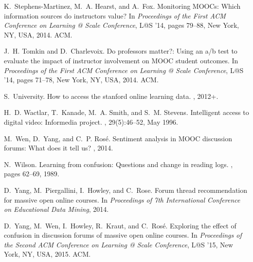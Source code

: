 \documentclass{edm_template}
\begin{document}
\begin{thebibliography}{10}
K.~Stephens-Martinez, M.~A. Hearst, and A.~Fox.
\newblock Monitoring {MOOC}s: Which information sources do instructors value?
\newblock In {\em Proceedings of the First ACM Conference on Learning @ Scale
  Conference}, L@S '14, pages 79--88, New York, NY, USA, 2014. ACM.

J.~H. Tomkin and D.~Charlevoix.
\newblock Do professors matter?: Using an a/b test to evaluate the impact of
  instructor involvement on {MOOC} student outcomes.
\newblock In {\em Proceedings of the First ACM Conference on Learning @ Scale
  Conference}, L@S '14, pages 71--78, New York, NY, USA, 2014. ACM.

S.~University.
\newblock How to access the stanford online learning data.
, 2012+.

H.~D. Wactlar, T.~Kanade, M.~A. Smith, and S.~M. Stevens.
\newblock Intelligent access to digital video: Informedia project.
, 29(5):46--52, May 1996.

M.~Wen, D.~Yang, and C.~P. Ros{\'e}.
\newblock Sentiment analysis in {MOOC} discussion forums: What does it tell us?
, 2014.

N.~Wilson.
\newblock Learning from confusion: Questions and change in reading logs.
, pages 62--69, 1989.

D.~Yang, M.~Piergallini, I.~Howley, and C.~Rose.
\newblock Forum thread recommendation for massive open online courses.
\newblock In {\em Proceedings of 7th International Conference on Educational
  Data Mining}, 2014.

D.~Yang, M.~Wen, I.~Howley, R.~Kraut, and C.~Ros{\'e}.
\newblock Exploring the effect of confusion in discussion forums of massive
  open online courses.
\newblock In {\em Proceedings of the Second ACM Conference on Learning @ Scale
  Conference}, L@S '15, New York, NY, USA, 2015. ACM.
  
\end{thebibliography}
\balancecolumns
\end{document}
